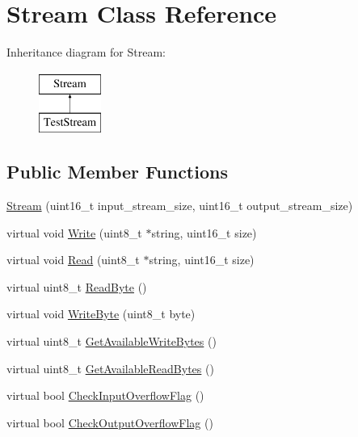 \hypertarget{class_stream}{\section{Stream Class Reference}
\label{class_stream}
}
Inheritance diagram for Stream\-:\begin{figure}[H]
\begin{center}
\leavevmode
\includegraphics[height=2.000000cm]{class_stream}
\end{center}
\end{figure}
\subsection*{Public Member Functions}
\begin{DoxyCompactItemize}
\item 
\hyperlink{class_stream_a2b738d6f4d3059de2ae3d444d68663bf}{Stream} (uint16\-\_\-t input\-\_\-stream\-\_\-size, uint16\-\_\-t output\-\_\-stream\-\_\-size)
\item 
virtual void \hyperlink{class_stream_a508be3423e4d99ab2757275fb723002a}{Write} (uint8\-\_\-t $\ast$string, uint16\-\_\-t size)
\item 
virtual void \hyperlink{class_stream_a4f3ec0f7a24ddcfd054566feb614afba}{Read} (uint8\-\_\-t $\ast$string, uint16\-\_\-t size)
\item 
virtual uint8\-\_\-t \hyperlink{class_stream_aeb3f1b3d55f4b502c02d73ce4de42714}{Read\-Byte} ()
\item 
virtual void \hyperlink{class_stream_aeaed767b3a8d946c6f81465fa83ff17f}{Write\-Byte} (uint8\-\_\-t byte)
\item 
virtual uint8\-\_\-t \hyperlink{class_stream_a6a16ddb03d3360cef4daf4d38245091d}{Get\-Available\-Write\-Bytes} ()
\item 
virtual uint8\-\_\-t \hyperlink{class_stream_a71cec6c46f3d50cc3ab420e93ae434e1}{Get\-Available\-Read\-Bytes} ()
\item 
virtual bool \hyperlink{class_stream_a088c4e68d568acfad715c56f408fe9f8}{Check\-Input\-Overflow\-Flag} ()
\item 
virtual bool \hyperlink{class_stream_aee6c201819b874c5934a270592d9d311}{Check\-Output\-Overflow\-Flag} ()
\end{DoxyCompactItemize}
